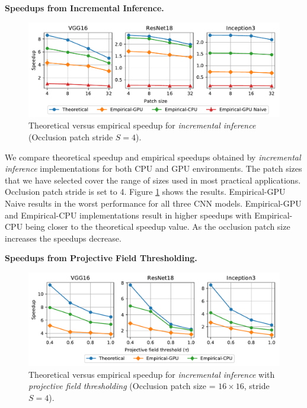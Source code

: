 \vspace{2mm}
\noindent \textbf{Speedups from Incremental Inference.}
\begin{figure}[t]
\includegraphics[width=\columnwidth]{images/5_2_1_edited}
\caption{Theoretical versus empirical speedup for \textit{incremental inference} (Occlusion patch stride $S=4$).}
\label{fig:5_2_1_edited}
\end{figure}

We compare theoretical speedup and empirical speedups obtained by \textit{incremental inference} implementations for both CPU and GPU environments.
The patch sizes that we have selected cover the range of sizes used in most practical applications.
Occlusion patch stride is set to 4.
Figure \ref{fig:5_2_1_edited} shows the results.
Empirical-GPU Naive results in the worst performance for all three CNN models.
Empirical-GPU and Empirical-CPU implementations result in higher speedups with Empirical-CPU being closer to the theoretical speedup value.
As the occlusion patch size increases the speedups decrease.

\vspace{2mm}
\noindent \textbf{Speedups from Projective Field Thresholding.}
\begin{figure}[t]
\includegraphics[width=\columnwidth]{images/5_2_2_edited}
\caption{Theoretical versus empirical speedup for \textit{incremental inference} with \textit{projective field thresholding} (Occlusion patch size = $16 \times 16$, stride $S=4$).}
\label{fig:5_2_2_edited}
\end{figure}

